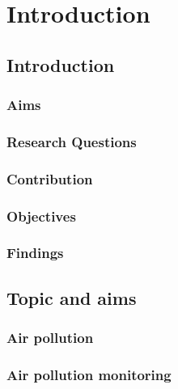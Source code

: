 \chapter{Introduction}%
\label{cha:introduction}

\section{Introduction}%
\label{sec:introduction}


\subsection{Aims}%
\label{sub:aims}

\subsection{Research Questions}%
\label{sub:research_questions}

\subsection{Contribution}%
\label{sub:contribution}

\subsection{Objectives}%
\label{sub:objectives}

\subsection{Findings}%
\label{sub:findings}

\section{Topic and aims}%
\label{sec:topic_and_aims}

\subsection{Air pollution}%
\label{sub:air_pollution}

\subsection{Air pollution monitoring}%
\label{sub:air_pollution_monitoring}

